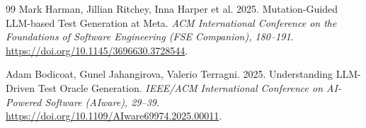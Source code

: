 \documentclass[sigconf,nonacm]{acmart}
\begin{document}
\begin{thebibliography}{99}
 Mark Harman, Jillian Ritchey, Inna Harper et al. 2025. Mutation-Guided LLM-based Test Generation at Meta. \emph{ACM International Conference on the Foundations of Software Engineering (FSE Companion), 180--191}. \url{https://doi.org/10.1145/3696630.3728544}.

 Adam Bodicoat, Gunel Jahangirova, Valerio Terragni. 2025. Understanding LLM-Driven Test Oracle Generation. \emph{IEEE/ACM International Conference on AI-Powered Software (AIware), 29--39}. \url{https://doi.org/10.1109/AIware69974.2025.00011}.
\end{thebibliography}
\end{document}
